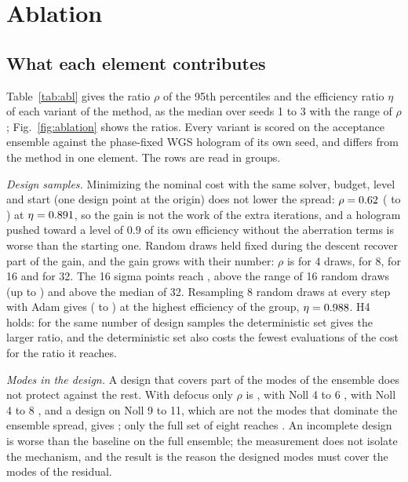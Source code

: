 \section{Ablation}\label{sec:ablation}

\subsection{What each element contributes}

Table~\ref{tab:abl} gives the ratio $\rho$ of the 95th percentiles and the efficiency ratio $\eta$ of each variant of the method, as the median over seeds 1 to 3 with the range of $\rho$; Fig.~\ref{fig:ablation} shows the ratios. Every variant is scored on the acceptance ensemble against the phase-fixed WGS hologram of its own seed, and differs from the method in one element.
The rows are read in groups.

\emph{Design samples.} Minimizing the nominal cost with the same solver, budget, level and start (one design point at the origin) does not lower the spread: $\rho=0.62$ (\ablNominalMin{} to \ablNominalMax) at $\eta=0.891$, so the gain is not the work of the extra iterations, and a hologram pushed toward a level of $0.9$ of its own efficiency without the aberration terms is worse than the starting one. Random draws held fixed during the descent
recover part of the gain, and the gain grows with their number: $\rho$ is \ablRandFourMed{} for 4 draws, \ablRandEightMed{} for 8, \ablRandSixteenMed{} for 16 and \ablRandThirtyTwoMed{} for 32. The 16 sigma points reach \ablDefaultMed{}, above the range of 16 random draws (up to \ablRandSixteenMax) and above the median of 32. Resampling 8 random draws at every step with Adam gives \ablAdamMed{} (\ablAdamMin{} to \ablAdamMax) at the highest
efficiency of the group, $\eta=0.988$. H4 holds: for the same number of design samples the deterministic set gives the larger ratio, and the deterministic set also costs the fewest evaluations of the cost for the ratio it reaches.

\emph{Modes in the design.} A design that covers part of the modes of the ensemble does not protect against the rest. With defocus only $\rho$ is \ablModesDefocusMed, with Noll 4 to 6 \ablModesToSixMed, with Noll 4 to 8 \ablModesToEightMed, and a design on Noll 9 to 11, which are not the modes that dominate the ensemble spread, gives \ablModesHighMed; only the full set of eight reaches \ablDefaultMed. An incomplete design is worse than the baseline on the full ensemble; the measurement does not isolate the mechanism, and the result is the reason the designed modes must cover the modes of the residual.

